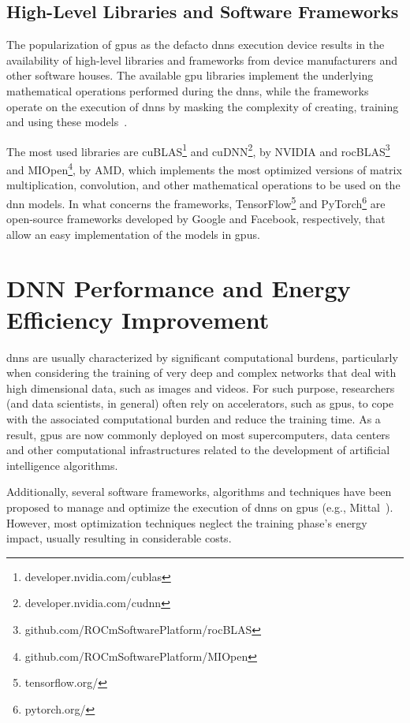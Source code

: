 \subsection{High-Level Libraries and Software Frameworks}

The popularization of \acrshort{gpu}s as the defacto \acrshort{dnn}s execution device results in the availability of high-level libraries and frameworks from device manufacturers and other software houses. The available \acrshort{gpu} libraries implement the underlying mathematical operations performed during the \acrshort{dnn}s, while the frameworks operate on the execution of \acrshort{dnn}s by masking the complexity of creating, training and using these models~\cite{jain_performance_2019}.

The most used libraries are cuBLAS\footnote{developer.nvidia.com/cublas} and cuDNN\footnote{developer.nvidia.com/cudnn}, by NVIDIA and rocBLAS\footnote{github.com/ROCmSoftwarePlatform/rocBLAS} and MIOpen\footnote{github.com/ROCmSoftwarePlatform/MIOpen}, by AMD, which implements the most optimized versions of matrix multiplication, convolution, and other mathematical operations to be used on the \acrshort{dnn} models. In what concerns the frameworks, TensorFlow\footnote{tensorflow.org/} and PyTorch\footnote{pytorch.org/} are open-source frameworks developed by Google and Facebook, respectively, that allow an easy implementation of the models in \acrshort{gpu}s.

\section{DNN Performance and Energy Efficiency Improvement}
\label{section:DNN_conventional}

\acrshort{dnn}s are usually characterized by significant computational burdens, particularly when considering the training of very deep and complex networks that deal with high dimensional data, such as images and videos. For such purpose, researchers (and data scientists, in general) often rely on accelerators, such as \acrshort{gpu}s, to cope with the associated computational burden and reduce the training time. As a result, \acrshort{gpu}s are now commonly deployed on most supercomputers, data centers and other computational infrastructures related to the development of artificial intelligence algorithms.

Additionally, several software frameworks, algorithms and techniques have been proposed to manage and optimize the execution of  \acrshort{dnn}s on \acrshort{gpu}s (e.g., Mittal~\cite{mittal_survey_2019}). However, most optimization techniques neglect the training phase's energy impact, usually resulting in considerable costs. 

